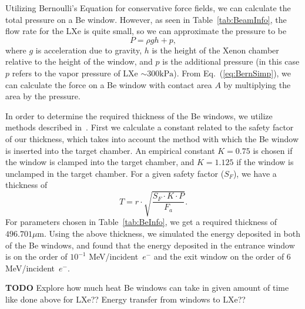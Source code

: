 \documentclass[%
reprint,
nofootinbib,
amsmath, amssymb,
aps,
floatfix,
]{revtex4-2}
\begin{document}
Utilizing Bernoulli's Equation for conservative force fields, we can calculate the total
pressure on a Be window.
However, as seen in Table~\ref{tab:BeamInfo}, the flow rate for the LXe is quite small,
so we can approximate the pressure to be
\begin{equation}
    P = \rho g h + p,
    \label{eq:BernSimp}
\end{equation}
where $g$ is acceleration due to gravity, $h$ is the height of the Xenon chamber
relative to the height of the window,
and $p$ is the additional pressure (in this case $p$ refers to the vapor pressure of LXe $\sim 300 \textrm{kPa}$).
From Eq.~(\ref{eq:BernSimp}), we can calculate the force on a Be window with contact area $A$ by 
multiplying the area by the pressure.

In order to determine the required thickness of the Be windows, we utilize methods described in~\cite{Crystran2019}.
First we calculate a constant related to the safety factor of our thickness, which takes into account
the method with which the Be window is inserted into the target chamber.
An empirical constant $K = 0.75$ is chosen if the window is clamped into the target chamber, and
$K = 1.125$ if the window is unclamped in the target chamber.  For a given safety factor ($S_F$),
we have a thickness of
\begin{equation}
    T = r\cdot\sqrt{\frac{S_F\cdot K\cdot P}{F_a}}.
\end{equation}
For parameters chosen in Table~\ref{tab:BeInfo}, we get a required thickness of $496.701 \mu \textrm{m}$.
Using the above thickness, we simulated the energy deposited in both of the Be windows, and found that
the energy deposited in the entrance window is on the order of $10^{-1}$ MeV/incident~$e^-$ and the exit window
on the order of 6 MeV/incident~$e^-$.

\textbf{TODO}
Explore how much heat Be windows can take in given amount of time like done above for LXe??
Energy transfer from windows to LXe??
\end{document}

